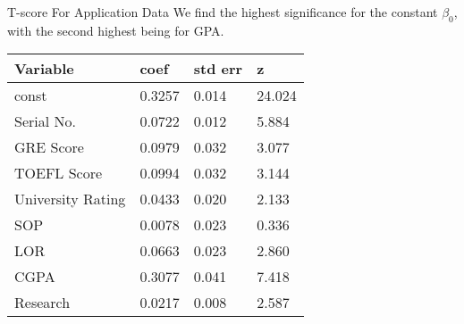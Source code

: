 \documentclass[10pt, table, dvipsnames,xcdraw, handout ]{beamer}
\begin{document}
\begin{frame}[fragile]{T-score For Application Data}
We find the highest significance for the constant $\beta_0$, with the second highest being for GPA. 
\begin{table}[]
\begin{tabular}{llll}
\hline
\textbf{Variable} & \textbf{coef} & \multicolumn{1}{c}{\textbf{std err}} & \textbf{z} \\ \hline
\rowcolor[HTML]{FFCCC9} 
const             & 0.3257        & 0.014                                & 24.024     \\
Serial No.        & 0.0722        & 0.012                                & 5.884      \\
GRE Score         & 0.0979        & 0.032                                & 3.077      \\
TOEFL Score       & 0.0994        & 0.032                                & 3.144      \\
University Rating & 0.0433        & 0.020                                & 2.133      \\
SOP               & 0.0078        & 0.023                                & 0.336      \\
LOR               & 0.0663        & 0.023                                & 2.860      \\
\rowcolor[HTML]{FFCCC9} 
CGPA              & 0.3077        & 0.041                                & 7.418      \\
Research          & 0.0217        & 0.008                                & 2.587     
\end{tabular}
\end{table}
\end{frame}
\end{document}
